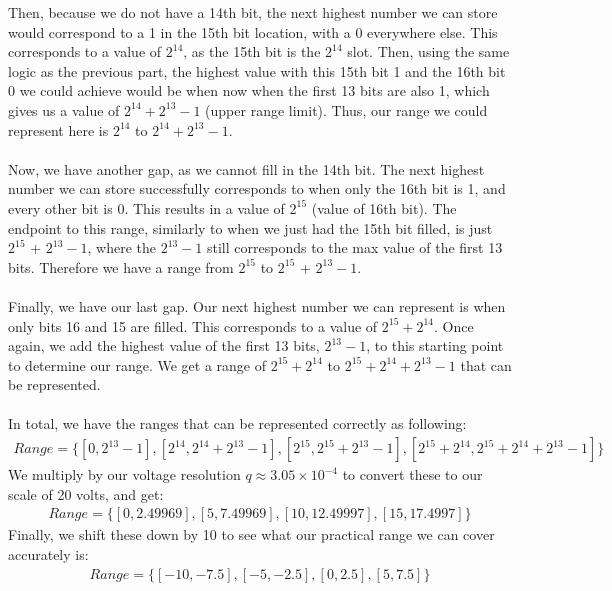 \documentclass[12pt, a4paper]{article}
\begin{document}
\begin{enumerate}
\begin{enumerate}
Then, because we do not have a 14th bit, the next highest number we can store would correspond to a 1 in the 15th bit location, with a 0 everywhere else. This corresponds to a value of $2^{14}$, as the 15th bit is the $2^{14}$ slot. Then, using the same logic as the previous part, the highest value with this 15th bit 1 and the 16th bit 0 we could achieve would be when now when the first 13 bits are also 1, which gives us a value of $2^{14} + 2^{13} - 1$ (upper range limit). Thus, our range we could represent here is $2^{14}$ to $2^{14} + 2^{13} - 1$. \\ \\
Now, we have another gap, as we cannot fill in the 14th bit. The next highest number we can store successfully corresponds to when only the 16th bit is 1, and every other bit is 0. This results in a value of $2^15$ (value of 16th bit). The endpoint to this range, similarly to when we just had the 15th bit filled, is just $2^{15}$ + $ 2^{13} - 1 $, where the  $2^{13} - 1$ still corresponds to the max value of the first 13 bits. Therefore we have a range from $2^{15}$ to $2^{15}$ + $ 2^{13} - 1 $. \\ \\
Finally, we have our last gap. Our next highest number we can represent is when only bits 16 and 15 are filled. This corresponds to a value of $2^{15} + 2^{14}$. Once again, we add the highest value of the first 13 bits, $ 2^{13} - 1 $, to this starting point to determine our range. We get a range of  $2^{15} + 2^{14}$ to $2^{15} + 2^{14} + 2^{13} - 1$ that can be represented.  \\ \\
In total, we have the ranges that can be represented correctly as following: \begin{align*}
Range = \{ [0, 2^{13} - 1], [ 2^{14} ,2^{14} + 2^{13} - 1], [2^{15},2^{15} +  2^{13} - 1], [2^{15} + 2^{14}, 2^{15} + 2^{14} + 2^{13} - 1]\}
\end{align*}
We multiply by our voltage resolution $q \approx 3.05 \times 10^{-4}$ to convert these to our scale of 20 volts, and get:
\begin{align*}
Range = \{ [0, 2.49969], [ 5 , 7.49969], [10, 12.49997], [15, 17.4997]\}
\end{align*}
Finally, we shift these down by 10 to see what our practical range we can cover accurately is:
\begin{align*}
Range = \{ [-10, -7.5], [-5 , -2.5], [0, 2.5], [5, 7.5]\}
\end{align*}

\end{enumerate}
\end{enumerate}
\end{document}
